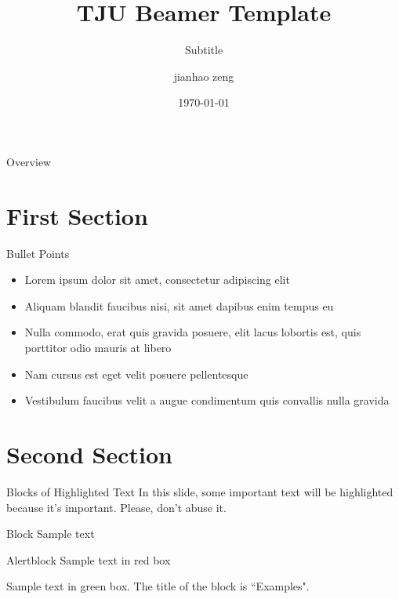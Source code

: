 \documentclass[aspectratio=169,xcolor=dvipsnames]{beamer}
\title[Short]{TJU Beamer Template}
\subtitle[Short]{Subtitle}
\author[Zeng]{jianhao zeng}
\institute{School of Electrical and Information Engineering \\ Tianjin University}
\date[2023]{\today}
\begin{document}
    \begin{frame}
        \titlepage
    \end{frame}

    \begin{frame}{Overview}
        \tableofcontents
    \end{frame}

\section{First Section}
\begin{frame}{Bullet Points}
    \begin{itemize}
        \item Lorem ipsum dolor sit amet, consectetur adipiscing elit
        \item Aliquam blandit faucibus nisi, sit amet dapibus enim tempus eu
        \item Nulla commodo, erat quis gravida posuere, elit lacus lobortis est, quis porttitor odio mauris at libero
        \item Nam cursus est eget velit posuere pellentesque
        \item Vestibulum faucibus velit a augue condimentum quis convallis nulla gravida
    \end{itemize}
\end{frame}

\section{Second Section}
\begin{frame}{Blocks of Highlighted Text}
    In this slide, some important text will be \alert{highlighted} because it's important. Please, don't abuse it.

    \begin{block}{Block}
        Sample text
    \end{block}

    \begin{alertblock}{Alertblock}
        Sample text in red box
    \end{alertblock}

    \begin{examples}
        Sample text in green box. The title of the block is ``Examples".
    \end{examples}
\end{frame}
\end{document}
